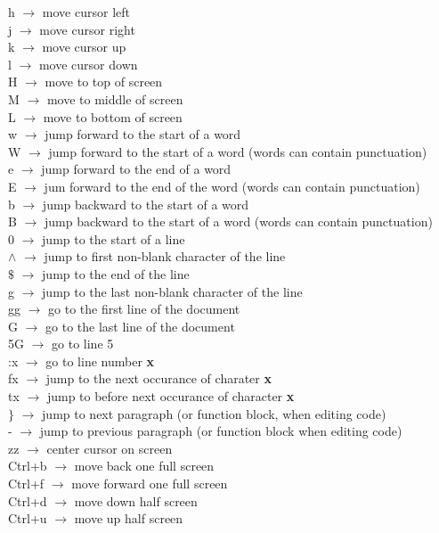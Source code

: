 \documentclass[twoside,a4paper]{article}
\newcommand{\tcr}{\color{red}}
\newcommand{\tck}{\color{black}}
\newcommand{\ra }{$\rightarrow$ }
\begin{document}
\begin{multicols}{2}
		\tcr h \tck \ra move cursor left\\
		\tcr j \tck \ra move cursor right\\
		\tcr k \tck \ra move cursor up\\
		\tcr l \tck \ra move cursor down\\
		\tcr H \tck \ra move to top of screen\\
		\tcr M \tck \ra move to middle of 
		screen\\
		\tcr L \tck \ra move to bottom of 
		screen\\
		\tcr w \tck \ra jump forward to the 
		start of a word\\
		\tcr W \tck \ra jump forward to the 
		start of a word (words can contain punctuation)\\
		\tcr e \tck \ra jump forward to the 
		end of a word\\
		\tcr E \tck \ra jum forward to the end 
		of the word (words can contain punctuation)\\
		\tcr b \tck \ra jump backward to the 
		start of a word\\
		\tcr B \tck \ra jump backward to the 
		start of a word (words can contain punctuation)\\
		\tcr 0 \tck \ra jump to the start of a
		line\\
		\tcr $\wedge$ \tck \ra jump to first 
		non-blank character of the line\\
		\tcr $\$$ \tck \ra jump to the end of 
		the line\\
		\tcr g \tck \ra jump to the last 
		non-blank character of the line\\
		\tcr gg \tck \ra go to the first line 
		of the document\\
		\tcr G \tck \ra go to the last line 
		of the document\\
		\tcr 5G \tck \ra go to line 5\\
		\tcr :x \tck \ra go to line number 
		\textbf{x}\\
		\tcr fx \tck \ra jump to the next 
		occurance of charater \textbf{x}\\
		\tcr tx \tck \ra jump to before next 
		occurance of character \textbf{x}\\
		\tcr $\}$ \tck \ra jump to next 
		paragraph (or function block, when editing code)\\
		\tcr - \tck \ra jump to previous 
		paragraph (or function block when editing code)\\
		\tcr zz \tck \ra center cursor on 
		screen\\
		\tcr Ctrl+b \tck \ra move back one 
		full screen\\
		\tcr Ctrl+f \tck \ra move forward one 
		full screen\\
		\tcr Ctrl+d \tck \ra move down half 
		screen\\
		\tcr Ctrl+u \tck \ra move up half 
		screen


\end{multicols}
\end{document}
